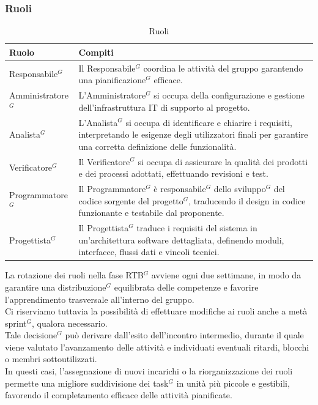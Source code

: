 \subsubsection{Ruoli}
\begin{table}[H]
\centering
\renewcommand{\arraystretch}{1.15}
\begin{tabular}{ |p{}|p{}|}
    \hline
    \textbf{Ruolo} & \textbf{Compiti} \\
    \hline
    Responsabile$^G$ & Il Responsabile$^G$ coordina le attività del gruppo garantendo una pianificazione$^G$ efficace. \\
    \hline
    Amministratore$^G$ & L’Amministratore$^G$ si occupa della configurazione e gestione dell’infrastruttura IT di supporto al progetto. \\
    \hline
    Analista$^G$ & L’Analista$^G$ si occupa di identificare e chiarire i requisiti, interpretando le esigenze degli utilizzatori finali per garantire una corretta definizione delle funzionalità. \\
    \hline
    Verificatore$^G$ & Il Verificatore$^G$ si occupa di assicurare la qualità dei prodotti e dei processi adottati, effettuando revisioni e test. \\
    \hline
    Programmatore$^G$ & Il Programmatore$^G$ è responsabile$^G$ dello sviluppo$^G$ del codice sorgente del progetto$^G$, traducendo il design in codice funzionante e testabile dal proponente. \\
    \hline
    Progettista$^G$ & Il Progettista$^G$ traduce i requisiti del sistema in un’architettura software dettagliata, definendo moduli, interfacce, flussi dati e vincoli tecnici. \\
    \hline
\end{tabular}
\caption{Ruoli}
\end{table}

La rotazione dei ruoli nella fase RTB$^G$ avviene ogni due settimane, in modo da garantire una distribuzione$^G$ equilibrata delle competenze e favorire l’apprendimento trasversale all’interno del gruppo.\\
Ci riserviamo tuttavia la possibilità di effettuare modifiche ai ruoli anche a metà sprint$^G$, qualora necessario.\\
Tale decisione$^G$ può derivare dall’esito dell’incontro intermedio, durante il quale viene valutato l’avanzamento delle attività e individuati eventuali ritardi, blocchi o membri sottoutilizzati.\\
In questi casi, l’assegnazione di nuovi incarichi o la riorganizzazione dei ruoli permette una migliore suddivisione dei task$^G$ in unità più piccole e gestibili, favorendo il completamento efficace delle attività pianificate.\\

